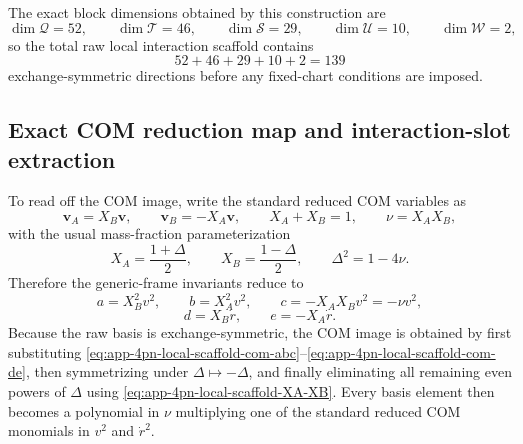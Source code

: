 \documentclass[11pt]{article}
\begin{document}
The exact block dimensions obtained by this construction are
\begin{equation}
\dim\mathcal Q=52,
\qquad
\dim\mathcal T=46,
\qquad
\dim\mathcal S=29,
\qquad
\dim\mathcal U=10,
\qquad
\dim\mathcal W=2,
\label{eq:app-4pn-local-scaffold-block-dims}
\end{equation}
so the total raw local interaction scaffold contains
\begin{equation}
52+46+29+10+2=139
\label{eq:app-4pn-local-scaffold-total-dim}
\end{equation}
exchange-symmetric directions before any fixed-chart conditions are imposed.

\subsection{Exact COM reduction map and interaction-slot extraction}
\label{app:local-generic-frame-scaffold-com-map}

To read off the COM image, write the standard reduced COM variables as
\begin{equation}
\mathbf v_A=X_B\mathbf v,
\qquad
\mathbf v_B=-X_A\mathbf v,
\qquad
X_A+X_B=1,
\qquad
\nu=X_AX_B,
\label{eq:app-4pn-local-scaffold-com-kinematics}
\end{equation}
with the usual mass-fraction parameterization
\begin{equation}
X_A=\frac{1+\Delta}{2},
\qquad
X_B=\frac{1-\Delta}{2},
\qquad
\Delta^2=1-4\nu.
\label{eq:app-4pn-local-scaffold-XA-XB}
\end{equation}
Therefore the generic-frame invariants reduce to
\begin{equation}
 a=X_B^2 v^2,
 \qquad
 b=X_A^2 v^2,
 \qquad
 c=-X_A X_B v^2=-\nu v^2,
 \label{eq:app-4pn-local-scaffold-com-abc}
\end{equation}
\begin{equation}
 d=X_B\dot r,
 \qquad
 e=-X_A\dot r.
 \label{eq:app-4pn-local-scaffold-com-de}
\end{equation}
Because the raw basis is exchange-symmetric, the COM image is obtained by first
substituting \eqref{eq:app-4pn-local-scaffold-com-abc}--\eqref{eq:app-4pn-local-scaffold-com-de},
then symmetrizing under \(\Delta\mapsto-\Delta\), and finally eliminating all
remaining even powers of \(\Delta\) using \eqref{eq:app-4pn-local-scaffold-XA-XB}.
Every basis element then becomes a polynomial in \(\nu\) multiplying one of the
standard reduced COM monomials in \(v^2\) and \(\dot r^2\).
\end{document}

